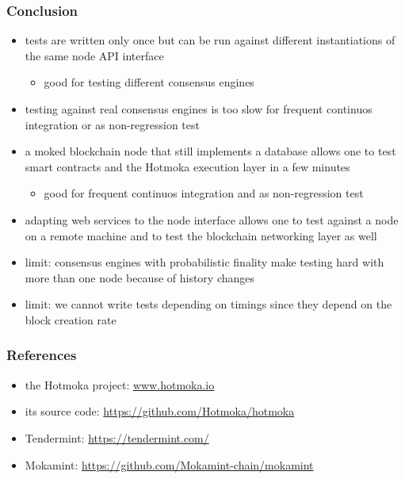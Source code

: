 \documentclass[11pt]{beamer}  %
\begin{document}
\begin{frame}\frametitle{Conclusion}
  \begin{itemize}
  \item tests are written only once but can be run against different instantiations
    of the same node API interface
    \begin{itemize}
    \item good for testing different consensus engines
    \end{itemize}
  \item testing against real consensus engines is too slow for
    frequent continuos integration or as non-regression test 
  \item a moked blockchain node that still implements a database allows one to test smart contracts
    and the Hotmoka execution layer in a few minutes
    \begin{itemize}
    \item good for frequent continuos integration and as non-regression test 
    \end{itemize}
  \item adapting web services to the node interface allows one to test against a node
    on a remote machine and to test the blockchain networking layer as well
  \item limit: consensus engines with probabilistic finality make testing hard with more than one node
    because of history changes
  \item limit: we cannot write tests depending on timings since they depend on the block creation rate
  \end{itemize}
\end{frame}

\begin{frame}\frametitle{References}

  \begin{itemize}
  \item the Hotmoka project: \url{www.hotmoka.io}
  \item its source code: \url{https://github.com/Hotmoka/hotmoka}
  \item Tendermint: \url{https://tendermint.com/}
  \item Mokamint: \url{https://github.com/Mokamint-chain/mokamint}
  \end{itemize}

\end{frame}
\end{document}
